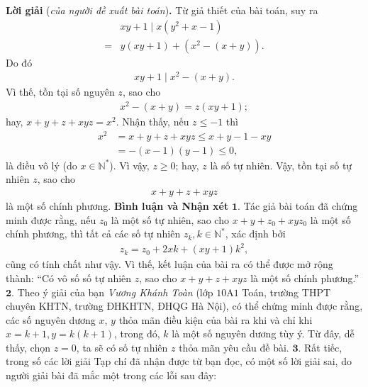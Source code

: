 \begin{multicols}{2}
	\vskip 0.05cm
	\textbf{\color{thachthuctoanhoc}Lời giải} (\textit{của người đề xuất bài toán})\textbf{\color{thachthuctoanhoc}.}
	\vskip 0.05cm
	Từ giả thiết của bài toán, suy ra
	\begin{align*}
		&{xy + 1} \mid x\left( {{y^2} + x - 1} \right) \\
		= &y\left( {xy + 1} \right) + \left( {{x^2} - \left( {x + y} \right)} \right).
	\end{align*}
	Do đó
	\begin{align*}
		 {xy + 1} \mid {x^2} - \left( {x + y} \right).
	\end{align*}
	Vì thế, tồn tại số nguyên $z$, sao cho
	\begin{align*}
		{x^2} - \left( {x + y} \right) = z\left( {xy + 1} \right);
	\end{align*}
	hay, $x + y + z + xyz = {x^2}.$
	\vskip 0.05cm  
	Nhận thấy, nếu $z \le -1$  thì
	\begin{align*}
		{x^2} &= x + y + z + xyz \le x + y - 1 - xy \\
		&= - \left( {x - 1} \right)\left( {y - 1} \right) \le 0,
	\end{align*}
	là điều vô lý (do  $x \in \mathbb{N^*}$).
	\vskip 0.05cm
	Vì vậy, $z \ge 0$; hay, $z$ là số tự nhiên.
	\vskip 0.05cm
	Vậy, tồn tại số tự nhiên $z$, sao cho 
	\begin{align*}
		x + y + z + xyz
	\end{align*} là một số chính phương.
	\vskip 0.05cm
	\textbf{\color{thachthuctoanhoc}Bình luận và Nhận xét}
	\vskip 0.05cm
	$\pmb{1.}$ Tác giả bài toán đã chứng minh được rằng, nếu $z_0$  là một số tự nhiên, sao cho $x + y + z_0 + xyz_0$  là một số chính phương, thì tất cả các số tự nhiên $z_k, k \in \mathbb{N^*}$, xác định bởi
	\begin{align*}
		{z_k} = {z_0} + 2xk + \left( {xy + 1} \right){k^2},
	\end{align*}
	cũng có tính chất như vậy. Vì thế, kết luận của bài ra có thể được mở rộng thành: “Có vô số số tự nhiên $z$, sao cho $x + y + z + xyz$ là một số chính phương.”
	\vskip 0.05cm
	$\pmb{2.}$ Theo ý giải của bạn \textit{Vương Khánh Toàn} (lớp $10$A$1$ Toán, trường THPT chuyên KHTN, trường ĐHKHTN, ĐHQG Hà Nội), có thể chứng minh được rằng, các số nguyên dương $x$, $y$ thỏa mãn điều kiện của bài ra khi và chỉ khi $x = k + 1, y = k(k + 1)$, trong đó, $k$ là một số nguyên dương tùy ý. Từ đây, dễ thấy, chọn $z = 0$, ta sẽ có số tự nhiên $z$ thỏa mãn yêu cầu đề bài.
	\vskip 0.05cm
	$\pmb{3.}$ Rất tiếc, trong số các lời giải Tạp chí đã nhận được từ bạn đọc, có một số lời giải sai, do người giải bài đã mắc một trong các lỗi sau đây:

\end{multicols}
